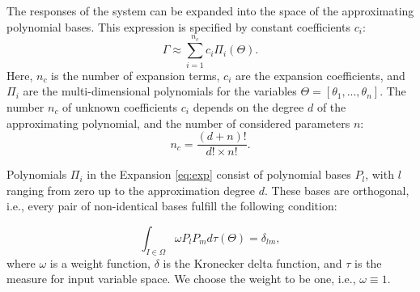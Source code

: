 The responses of the system can be expanded into the
space of the approximating polynomial bases. This expression is specified by constant coefficients $c_i$:
%
\begin{equation}
\Gamma\approx\underset{i=1}{\overset{n_c}{\sum}}c_{i}\Pi_{i}(\Theta).
  \label{eq:exp}
\end{equation} Here, $n_c$ is the number of expansion terms, $c_{i}$ are the
expansion coefficients, and
$\Pi_{i}$ are the multi-dimensional polynomials for the variables
$\Theta=[\theta_{1},...,\theta_{n}]$. The number $n_c$ of unknown
coefficients $c_{i}$ depends on the degree $d$ of the approximating polynomial,
and the number of considered parameters $n$:
%
\begin{equation}
 n_c=\frac{(d+n)!}{d!\times n!}.
 \label{eq:np}
\end{equation}
%


Polynomials $\Pi_i$ in the Expansion \ref{eq:exp} consist of polynomial bases
$P_l$, with $l$ ranging from zero up to the approximation degree $d$. These
bases are orthogonal, i.e., every pair of non-identical bases fulfill the
following condition:

\begin{equation}
\int_{I\in\Omega}\omega
P_{l}P_{m}d\tau(\Theta)=\delta_{lm},\label{eq:orth}\end{equation} where $\omega$
is a weight function, $\delta$ is the Kronecker delta function, and $\tau$ is
the measure for input variable space. We choose the weight to be one, i.e.,
$\omega\equiv1$. 

